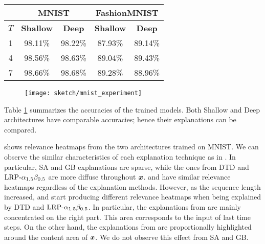 \renewcommand{\arraystretch}{1.5}
\begin{table}[]
\centering
{}
\begin{tabular}{cc|c|c|c|}
\cline{2-5}
& \multicolumn{2}{|c|}{\textbf{MNIST}} & \multicolumn{2}{|c|}{\textbf{FashionMNIST}} \\ \hline
\multicolumn{1}{|c|}{$T$}   & \multicolumn{1}{c|}{\textbf{Shallow}} & \multicolumn{1}{c|}{\textbf{Deep}} & \multicolumn{1}{c|}{\textbf{Shallow}} & \multicolumn{1}{c|}{\textbf{Deep}} \\ \hline
\multicolumn{1}{|c|}{1} & 98.11\%   & 98.22\% & 87.93\%  & 89.14\%                           \\
\multicolumn{1}{|c|}{4} & 98.56\% & 98.63\%  & 89.04\%  & 89.43\%                            \\
\multicolumn{1}{|c|}{7} & 98.66\%  & 98.68\% & 89.28\%  & 88.96\%  \\ \hline
\end{tabular}

\label{tab:mnist_model_acc}
\end{table}
\renewcommand{\arraystretch}{1}



 \begin{figure}[!htb]
\centering
\texttt{[image: sketch/mnist\_experiment]}
\label{fig:mnist_experiment}
\end{figure}


Table \ref{tab:mnist_model_acc} summarizes the accuracies of the trained models. Both Shallow and Deep architectures have comparable accuracies; hence their explanations can be compared. 

\addfigure{\ref{fig:mnist_experiment}} shows relevance heatmaps from the two architectures trained on MNIST.  We can observe the similar characteristics of each explanation technique as in \addfigure{\ref{fig:lenet_heatmaps}}. In particular, SA and GB explanations are sparse, while the ones from DTD and $\text{LRP-}\alpha_{1.5}\beta_{0.5}$ are more diffuse throughout $\boldsymbol{x}$.    and  have similar relevance heatmaps regardless of the explanation methods.  However, as the sequence length increased,  and   start producing  different relevance heatmaps when being explained by DTD and $\text{LRP-}\alpha_{1.5}\beta_{0.5}$.  In particular,  the explanations from   are mainly concentrated on the right part. This area corresponds to the input of last time steps. On the other hand,  the explanations from  are proportionally  highlighted around the content area of $\boldsymbol{x}$. We do not observe this effect from SA and GB.


